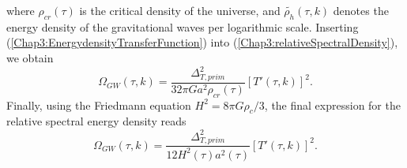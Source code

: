 \documentclass[11pt,a4paper,twoside]{book}
\begin{document}
where $ \rho_{cr}(\tau) $ is the critical density of the universe, and $ \tilde{\rho_{h}}(\tau,k) $ denotes the energy density of the gravitational waves per logarithmic scale. Inserting (\ref{Chap3:EnergydensityTransferFunction}) into (\ref{Chap3:relativeSpectralDensity}), we obtain
\begin{equation}
	\label{Chap3:RelativeSpectralDensity_TransferFunction}
	\Omega_{GW}(\tau,k) = \frac{\Delta_{T,prim}^{2}}{32\pi Ga^{2}\rho_{cr}(\tau)}[T'(\tau,k)]^{2}.
\end{equation}
Finally, using the Friedmann equation $ H^{2}=8\pi G \rho_{c}/3 $, the final expression for the relative spectral energy density reads
\begin{equation}
	\label{Chap3:spectralDensityFinal}
		\Omega_{GW}(\tau,k) = \frac{\Delta_{T,prim}^{2}}{12H^{2}(\tau)a^{2}(\tau)}[{T'(\tau,k)}]^{2}.
\end{equation}
\end{document}
